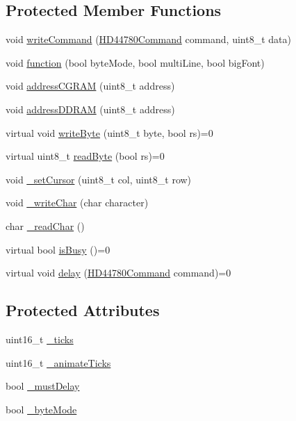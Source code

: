 \subsection*{Protected Member Functions}
\begin{DoxyCompactItemize}
\item 
void \hyperlink{classflame_1_1_display___h_d44780_a5a81eae9ce61da5f5873f272feea3ba9}{write\-Command} (\hyperlink{namespaceflame_ad814bac19b0569ff480de071076a23e9}{H\-D44780\-Command} command, uint8\-\_\-t data)
\item 
void \hyperlink{classflame_1_1_display___h_d44780_ac4a698ce422c7de3e32130aa7a1a289d}{function} (bool byte\-Mode, bool multi\-Line, bool big\-Font)
\item 
void \hyperlink{classflame_1_1_display___h_d44780_a425d2d57165fe2e098a36a41b4a3e017}{address\-C\-G\-R\-A\-M} (uint8\-\_\-t address)
\item 
void \hyperlink{classflame_1_1_display___h_d44780_a77c19f4474b69b500ed0dc467fd21b70}{address\-D\-D\-R\-A\-M} (uint8\-\_\-t address)
\item 
virtual void \hyperlink{classflame_1_1_display___h_d44780_a7a6b0c6550f20961f3cec7b07e0835ed}{write\-Byte} (uint8\-\_\-t byte, bool rs)=0
\item 
virtual uint8\-\_\-t \hyperlink{classflame_1_1_display___h_d44780_ae3409f84516a6533d88bc70b200a6e23}{read\-Byte} (bool rs)=0
\item 
void \hyperlink{classflame_1_1_display___h_d44780_adba62c96c907f965995ceaae8da5dc6d}{\-\_\-set\-Cursor} (uint8\-\_\-t col, uint8\-\_\-t row)
\item 
void \hyperlink{classflame_1_1_display___h_d44780_aced521ac701a22b68bc935dfc925708c}{\-\_\-write\-Char} (char character)
\item 
char \hyperlink{classflame_1_1_display___h_d44780_a2bf6745d21c83b418df65b065aa8ccb3}{\-\_\-read\-Char} ()
\item 
virtual bool \hyperlink{classflame_1_1_display___h_d44780_a665b559a3a2370fada65efd724a412b9}{is\-Busy} ()=0
\item 
virtual void \hyperlink{classflame_1_1_display___h_d44780_aa15098f89b2df993a38731033ca20a4d}{delay} (\hyperlink{namespaceflame_ad814bac19b0569ff480de071076a23e9}{H\-D44780\-Command} command)=0
\end{DoxyCompactItemize}
\subsection*{Protected Attributes}
\begin{DoxyCompactItemize}
\item 
uint16\-\_\-t \hyperlink{classflame_1_1_display___h_d44780_a58f971ca89d3a722304db94db25830b2}{\-\_\-ticks}
\item 
uint16\-\_\-t \hyperlink{classflame_1_1_display___h_d44780_aa87fd152ce1f1dd679ea6aeae6fdf596}{\-\_\-animate\-Ticks}
\item 
bool \hyperlink{classflame_1_1_display___h_d44780_abd557b0db9b085b5781a760b6660ec81}{\-\_\-must\-Delay}
\item 
bool \hyperlink{classflame_1_1_display___h_d44780_a719e1ad8661a35fbcc440ac4f1492657}{\-\_\-byte\-Mode}
\end{DoxyCompactItemize}


